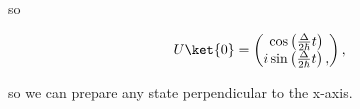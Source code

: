    \noindent so 
   
   \begin{equation}
	   U\ket{0} = \begin{pmatrix}
		   \cos\left(\frac{\Delta}{2\hbar}t\right)\\
		   i\sin\left(\frac{\Delta}{2\hbar}t\right),
	   \end{pmatrix},
   \end{equation}
   
   \noindent so we can prepare any state perpendicular to the x-axis.
   
   
  \newpage 
